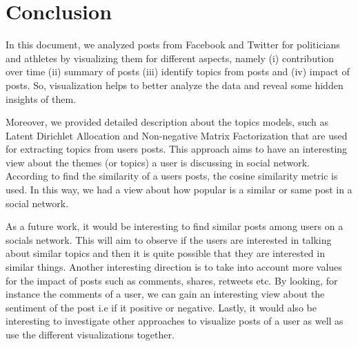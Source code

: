\section{Conclusion}

In this document, we analyzed posts from Facebook and Twitter for politicians and athletes by visualizing them for different aspects, namely (i) contribution over time (ii) summary of posts (iii) identify topics from posts and (iv) impact of posts. So, visualization helps to better analyze the data and reveal some hidden insights of them. 


Moreover, we provided detailed description about the topics models, such as Latent Dirichlet Allocation and Non-negative Matrix Factorization that are used for extracting topics from users posts. This approach aims to have an interesting view about the themes (or topics) a user is discussing in social network. According to find the similarity of a users posts, the cosine similarity metric is used. In this way, 
we had a view about how popular is a similar or same post in a social network. 


As a future work, it would be interesting to find similar posts among users on a socials network. This will aim to observe if the users are interested in talking about similar topics and then it is quite possible that they are interested in similar things. Another interesting direction is to take into account more values for the impact of posts such as comments, shares, retweets etc. By looking, for instance the comments of a user, we can gain an interesting view about the sentiment of the post i.e if it positive or negative. Lastly, it would also be interesting to investigate other approaches to visualize posts of a user as well as use the different visualizations together.

